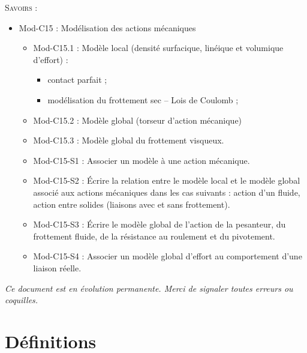 \documentclass[10pt]{article}
\begin{document}
\begin{savoir}
\textsc{Savoirs :}
\begin{itemize}
\item Mod-C15 : Modélisation des actions mécaniques
\begin{itemize}
\item Mod-C15.1 : Modèle local (densité surfacique, linéique et volumique d’effort) :
\begin{itemize}
\item contact parfait ;
\item modélisation du frottement sec -- Lois de Coulomb ;
\end{itemize}
\item Mod-C15.2 : Modèle global (torseur d’action mécanique)
\item Mod-C15.3 : Modèle global du frottement visqueux.
\end{itemize}
\begin{itemize}
\item Mod-C15-S1 : Associer un modèle à une action mécanique.
\item Mod-C15-S2 : Écrire la relation entre le modèle local et le modèle global associé aux actions mécaniques dans les cas suivants : action d’un fluide, action entre solides (liaisons avec et sans frottement).
\item Mod-C15-S3 : Écrire le modèle global de l’action de la pesanteur, du frottement fluide, de la résistance au roulement et du pivotement.
\item Mod-C15-S4 : Associer un modèle global d’effort au comportement d’une liaison réelle.
\end{itemize}
\end{itemize}
\end{savoir}

\setlength{\parskip}{0ex plus 0.2ex minus 0ex}
 \renewcommand{\contentsname}{}
 \renewcommand{\baselinestretch}{1}

\tableofcontents

 \renewcommand{\baselinestretch}{1.2}
\setlength{\parskip}{2ex plus 0.5ex minus 0.2ex}

\textit{Ce document est en évolution permanente. Merci de signaler toutes
erreurs ou coquilles.}

\section{Définitions}
\end{document}
